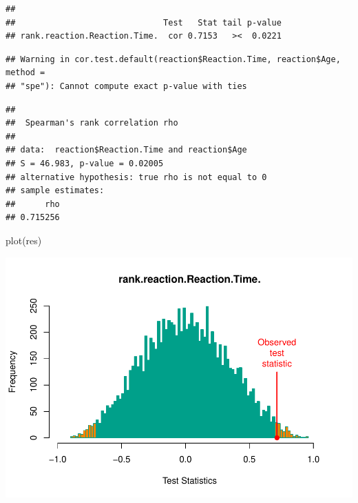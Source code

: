 \documentclass[
]{article}
\newenvironment{Shaded}{\begin{snugshade}}{\end{snugshade}}
\newcommand{\AttributeTok}[1]{\textcolor[rgb]{0.77,0.63,0.00}{#1}}
\newcommand{\FunctionTok}[1]{\textcolor[rgb]{0.00,0.00,0.00}{#1}}
\newcommand{\NormalTok}[1]{#1}
\newcommand{\SpecialCharTok}[1]{\textcolor[rgb]{0.00,0.00,0.00}{#1}}
\newcommand{\StringTok}[1]{\textcolor[rgb]{0.31,0.60,0.02}{#1}}
\begin{document}
\begin{verbatim}
## 
##                              Test   Stat tail p-value
## rank.reaction.Reaction.Time.  cor 0.7153   ><  0.0221
\end{verbatim}

\begin{Shaded}
\end{Shaded}

\begin{verbatim}
## Warning in cor.test.default(reaction$Reaction.Time, reaction$Age, method =
## "spe"): Cannot compute exact p-value with ties
\end{verbatim}

\begin{verbatim}
## 
##  Spearman's rank correlation rho
## 
## data:  reaction$Reaction.Time and reaction$Age
## S = 46.983, p-value = 0.02005
## alternative hypothesis: true rho is not equal to 0
## sample estimates:
##      rho 
## 0.715256
\end{verbatim}

\begin{Shaded}
\begin{Highlighting}[]
\FunctionTok{plot}\NormalTok{(res)}
\end{Highlighting}
\end{Shaded}

\begin{center}\includegraphics{perm_files/figure-latex/unnamed-chunk-21-1} \end{center}
\end{document}
